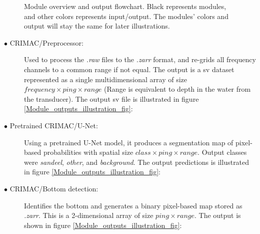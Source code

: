                               \begin{figure}[H]
                \centering
                
                \caption[Module overview]{Module overview and output flowchart. Black represents modules, and other colors represents input/output. The modules' colors and output will stay the same for later illustrations.}
              	\medskip 
                \label{Module_overview_fig}
            \end{figure} 
            \begin{description}
            
              \item[$\bullet$ CRIMAC/Preprocessor:] Used to process the \textit{.raw} files to the \textit{.zarr} format, and re-grids all frequency channels to a common range if not equal. The output is a \gls{sv} dataset represented as a single multidimensional array of size $frequency \times ping \times range$ (Range is equivalent to depth in the water from the transducer). The output \gls{sv} file is illustrated in figure \ref{Module_outputs_illustration_fig}:%
                
              \item[$\bullet$ Pretrained CRIMAC/U-Net:] Using a pretrained U-Net model, it produces a segmentation map of pixel-based probabilities with spatial size $class \times ping \times range$. Output classes were \textit{sandeel}, \textit{other}, and \textit{background}. The output predictions is illustrated in figure \ref{Module_outputs_illustration_fig}:
              
              
              \item[$\bullet$ CRIMAC/Bottom detection:] Identifies the bottom and generates a binary pixel-based map stored as \textit{.zarr}. This is a 2-dimensional array of size $ping \times range$. The output is shown in figure \ref{Module_outputs_illustration_fig}:

            \end{description}
        


